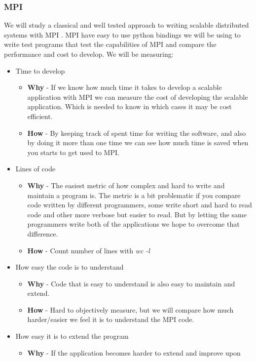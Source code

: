 \documentclass{article}
\begin{document}
{\subsubsection{MPI}
We will study a classical and well tested approach to writing
scalable distributed systems with MPI \cite{gropp1996high}. MPI have easy
to use python bindings \cite{miller2002pympi} \cite{millerparallel} we will be
using to write test programs that test the capabilities of MPI and compare the
performance and cost to develop.
We will be measuring:
\begin{itemize}
\item Time to develop
\begin{itemize}
\item{ \textbf{Why} - If we know how much time it takes to develop a scalable application with
MPI we can measure the cost of developing the scalable application. Which is needed to
know in which cases it may be cost efficient.}
\item{ \textbf{How} - By keeping track of spent time for writing the software, 
and also by doing it more than one time we can see how much time is saved
when you starts to get used to MPI.}
\end{itemize}
\item Lines of code
\begin{itemize}
\item{ \textbf{Why} - The easiest metric of how complex and hard to write and
 maintain a program is. The metric is a bit problematic if you compare
 code written by different programmers, some write short and hard to read
 code and other more verbose but easier to read. But by letting the same
 programmers write both of the applications we hope to overcome that 
 difference.}
\item{ \textbf{How} - Count number of lines with \emph{wc -l}}
\end{itemize}
\item How easy the code is to understand
\begin{itemize}
\item{ \textbf{Why} - Code that is easy to understand is also easy to maintain and extend. }
\item{ \textbf{How} - Hard to objectively measure, but we will compare how much harder/easier we 
 feel it is to understand the MPI code. }
\end{itemize}
\item How easy it is to extend the program
\begin{itemize}
\item{ \textbf{Why} - If the application becomes harder to extend and improve upon 
}
\end{itemize}
\end{itemize}}
\end{document}
